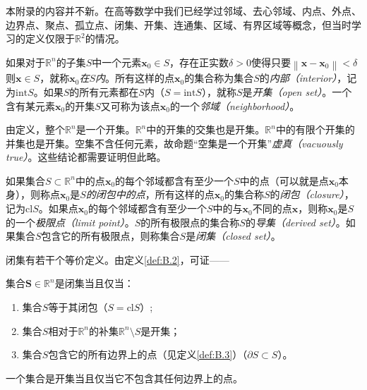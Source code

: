 \documentclass[main.tex]{subfiles}
\begin{document}
本附录的内容并不新。在高等数学中我们已经学过邻域、去心邻域、内点、外点、边界点、聚点、孤立点、闭集、开集、连通集、区域、有界区域等概念\cite[\S 7.1]{华工高数2009下}，但当时学习的定义仅限于$\mathbb{R}^2$的情况。

\begin{definition}[开集]\label{def:B.1}
    如果对于$\mathbb{R}^n$的子集$S$中一个元素$\mathbf{x}_0\in S$，存在正实数$\delta>0$使得只要$\left\|\mathbf{x}-\mathbf{x}_0\right\|<\delta$则$\mathbf{x}\in S$，就称\emph{$\mathbf{x}_0$在$S$内}。所有这样的点$\mathbf{x}_0$的集合称为集合$S$的\emph{内部（interior）}，记为$\mathrm{int}S$。如果$S$的所有元素都在$S$内（$S=\mathrm{int}S$），就称$S$是\emph{开集（open set）}。一个含有某元素$\mathbf{x}_0$的开集$S$又可称为该点$\mathbf{x}_0$的一个\emph{邻域（neighborhood）}。
\end{definition}

由定义，整个$\mathbb{R}^n$是一个开集。$\mathbb{R}^n$中的开集的交集也是开集。$\mathbb{R}^n$中的有限个开集的并集也是开集。空集不含任何元素，故命题“空集是一个开集”\emph{虚真（vacuously true）}。这些结论都需要证明但此略。

\begin{definition}[闭集]\label{def:B.2}
    如果集合$S\subset\mathbb{R}^n$中的点$\mathbf{x}_0$的每个邻域都含有至少一个$S$中的点（可以就是点$\mathbf{x}_0$本身），则称点$\mathbf{x}_0$是\emph{$S$的闭包中的点}，所有这样的点$\mathbf{x}_0$的集合称$S$的\emph{闭包（closure）}，记为$\mathrm{cl}S$。如果点$\mathbf{x}_0$的每个邻域都含有至少一个$S$中的与$\mathbf{x}_0$不同的点$\mathbf{x}$，则称$\mathbf{x}_0$是$S$的一个\emph{极限点（limit point）}。$S$的所有极限点的集合称$S$的\emph{导集（derived set）}。如果集合$S$包含它的所有极限点，则称集合$S$是\emph{闭集（closed set）}。
\end{definition}

闭集有若干个等价定义。由定义\ref{def:B.2}，可证——

\begin{theorem}\label{thm:B.1}
    集合$\mathbf{S}\in\mathbb{R}^n$是闭集当且仅当：
    \begin{enumerate}
        \item 集合$S$等于其闭包（$S=\mathrm{cl}S$）;
        \item 集合$S$相对于$\mathbb{R}^n$的补集$\mathbb{R}^n\setminus S$是开集；
        \item 集合$S$包含它的所有边界上的点（见定义\ref{def:B.3}）（$\partial S\subset S$）。
    \end{enumerate}
\end{theorem}
\begin{corollary}
    一个集合是开集当且仅当它不包含其任何边界上的点。
\end{corollary}
\end{document}
